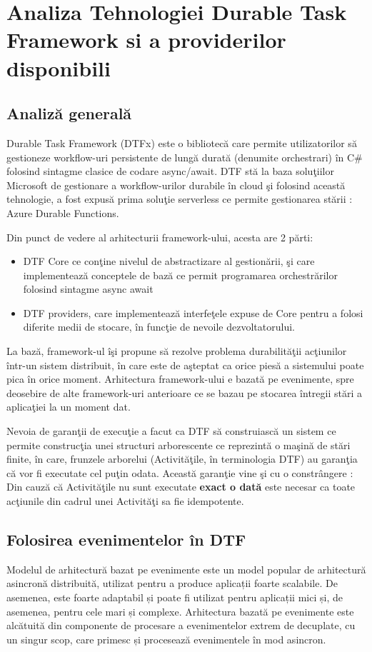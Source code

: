 \chapter{Analiza Tehnologiei Durable Task Framework si a providerilor disponibili}
\section{Analiză generală}
\quad Durable Task Framework (DTFx) este o bibliotecă care permite utilizatorilor să gestioneze workflow-uri persistente de lungă durată (denumite orchestrari) în C\# folosind sintagme clasice de codare async/await. DTF stă la baza soluţiilor Microsoft de gestionare a workflow-urilor durabile în cloud şi folosind această tehnologie, a fost expusă prima soluţie serverless ce permite gestionarea stării : Azure Durable Functions. 
\par Din punct de vedere al arhitecturii framework-ului, acesta are 2 părti:
\begin{itemize} 
\item DTF Core ce conţine nivelul de abstractizare al gestionării, şi care implementează conceptele de bază ce permit programarea orchestrărilor folosind sintagme async await
\item DTF providers, care implementează interfeţele expuse de Core pentru a folosi diferite medii de stocare, în funcţie de nevoile dezvoltatorului. 
\end{itemize} 
\par La bază, framework-ul îşi propune să rezolve problema durabilităţii acţiunilor într-un sistem distribuit, în care este de aşteptat ca orice piesă a sistemului poate pica în orice moment. Arhitectura framework-ului e bazată pe evenimente, spre deosebire de alte framework-uri anterioare ce se bazau pe stocarea întregii stări a aplicaţiei la un moment dat. 
\par Nevoia de garanţii de execuţie a facut ca DTF să construiască un sistem ce permite construcţia unei structuri arborescente ce reprezintă o maşină de stări finite, în care, frunzele arborelui (Activităţile, în terminologia DTF) au garanţia că vor fi executate cel puţin odata. Această garanţie vine şi cu o constrângere : Din cauză că Activităţile nu sunt executate \textbf{exact o dată} este necesar ca toate acţiunile din cadrul unei Activităţi sa fie idempotente. 
\section{Folosirea evenimentelor în DTF}
\quad Modelul de arhitectură bazat pe evenimente este un model popular de arhitectură asincronă distribuită, utilizat pentru a produce aplicații foarte scalabile. De asemenea, este foarte adaptabil și poate fi utilizat pentru aplicații mici și, de asemenea, pentru cele mari și complexe. Arhitectura bazată pe evenimente este alcătuită din componente de procesare a evenimentelor extrem de decuplate, cu un singur scop, care primesc și procesează evenimentele în mod asincron.

